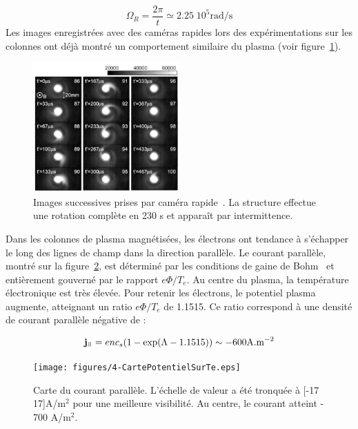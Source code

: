 \begin{refsection}
\begin{equation}
\Omega_R=\frac{2\pi}{t}\simeq2.25\;10^5\text{rad/s}
\end{equation}
Les images enregistrées avec des caméras rapides lors des expérimentations
sur les colonnes ont déjà montré un
comportement similaire du plasma (voir figure~\ref{4-CybeleNagdis}). 

\begin{figure}[!htbp]
\centering
\includegraphics[width=0.5\textwidth]{figures/4-CybeleNAGDIS.png}
\caption{Images successives prises par caméra rapide~\parencite{NagdisCamera}.
La structure effectue une rotation complète en 230 \micro s et apparaît par
intermittence.
\label{4-CybeleNagdis}}
\end{figure}

Dans les colonnes de plasma magnétisées, les électrons ont tendance à s'échapper
le long des lignes de champ dans la direction parallèle. Le courant parallèle,
montré sur la figure~\ref{4-cybeleCartePotentielSurTe}, est déterminé par les
conditions de gaine de Bohm~\parencite{Stangeby} et entièrement gouverné par le
rapport $e\Phi/T_e$. Au centre du plasma, la température électronique est très
élevée. Pour retenir les électrons, le potentiel plasma augmente, atteignant un
ratio $e\Phi/T_e$ de 1.1515. Ce ratio correspond à une densité de courant
parallèle négative de :

\begin{equation}
\mathbf j_\para=enc_s(1-\exp(\Lambda-1.1515))\sim -600\text{A.m}\puissance{-2}
\end{equation}

\begin{figure}[!htbp]
  \centering
    \texttt{[image: figures/4-CartePotentielSurTe.eps]}
    \caption{Carte du courant parallèle.
    L'échelle de valeur a été tronquée à
    [-17 17]A/m$^2$ pour une meilleure
    visibilité. Au centre, le courant atteint
    - 700 A/m$^2$.\label{4-cybeleCartePotentielSurTe}}
\end{figure}


\end{refsection}
